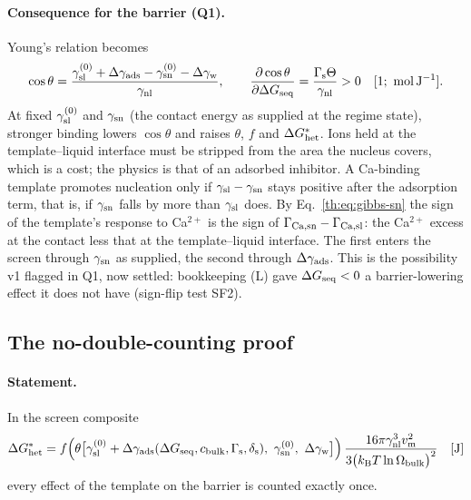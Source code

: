 \paragraph{Consequence for the barrier (Q1).} Young's relation becomes
\begin{equation}\label{th:eq:young-ads}
\cos\theta=\frac{\gamma_\mathrm{sl}^{(0)}+\Delta\gamma_\mathrm{ads}-\gamma_\mathrm{sn}^{(0)}-\Delta\gamma_\mathrm{w}}{\gamma_\mathrm{nl}},\qquad
\frac{\partial\cos\theta}{\partial\Delta G_\mathrm{seq}}=\frac{\Gamma_\mathrm{s}\Theta}{\gamma_\mathrm{nl}}>0 \quad[\mathrm{1;\ mol\,J^{-1}}].
\end{equation}
At fixed $\gamma_\mathrm{sl}^{(0)}$ and $\gamma_\mathrm{sn}$ (the contact energy as supplied at the regime state), stronger binding
lowers $\cos\theta$ and raises $\theta$, $f$ and $\Delta G^{*}_\mathrm{het}$. Ions held at the template--liquid
interface must be stripped from the area the nucleus covers, which is a cost; the physics is that
of an adsorbed inhibitor. A Ca-binding template promotes nucleation only if $\gamma_\mathrm{sl}-\gamma_\mathrm{sn}$ stays
positive after the adsorption term, that is, if $\gamma_\mathrm{sn}$ falls by more than $\gamma_\mathrm{sl}$ does. By
Eq.~\eqref{th:eq:gibbs-sn} the sign of the template's response to Ca$^{2+}$ is the sign of
$\Gamma_\mathrm{Ca,sn}-\Gamma_\mathrm{Ca,sl}$: the Ca$^{2+}$ excess at the contact less that at the template--liquid interface.
The first enters the screen through $\gamma_\mathrm{sn}$ as supplied, the second through $\Delta\gamma_\mathrm{ads}$. This is the
possibility v1 flagged in Q1, now settled: bookkeeping (L) gave $\Delta G_\mathrm{seq}<0$ a barrier-lowering
effect it does not have (sign-flip test SF2).

\subsection{The no-double-counting proof}

\paragraph{Statement.} In the screen composite
\begin{equation}\label{th:eq:composite}
\DGhet=f\Big(\theta\big[\gslz+\dga(\DGseq,\cb,\Gs,\ds),\ \gsnz,\ \dgw\big]\Big)\,
\frac{16\pi\gnl^{3}\vm^{2}}{3\big(\kB T\ln\Omb\big)^{2}} \un{J}
\end{equation}
every effect of the template on the barrier is counted exactly once.

